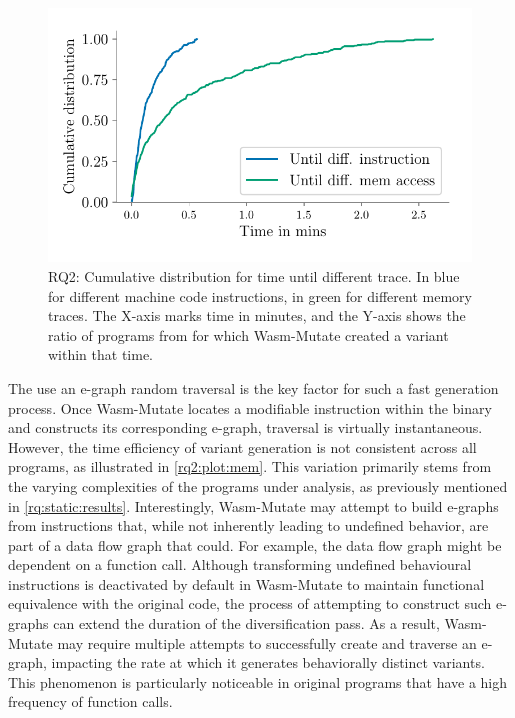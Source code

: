\documentclass[a4paper,fleqn]{cas-dc}
\newcommand*\badge[1]{ \colorbox{red}{\color{white}#1}}
\newcommand{\tool}{{\sc Wasm-Mutate}\xspace}
\newcommand{\todo}[1]{%
\refstepcounter{todo}
\noindent\textbf{\badge{TODO}} {\color{red}#1}
\addcontentsline{td}{todo}
{\color{red}\thesection.\thetodo\xspace #1}}
\begin{document}
\begin{figure}
    \centering
    \includegraphics[width=\linewidth]{plots/rq2/oracle.cumulative.pdf}
    \caption{RQ2: Cumulative distribution for time until different trace. In blue for different machine code instructions, in green for different memory traces. The X-axis marks time in minutes, and the Y-axis shows the ratio of programs from \nProgramsRosetta for which \tool created a variant within that time.}
  \label{rq2:plot:mem}
\end{figure}


The use an e-graph random traversal is the key factor for such a fast generation process.
Once \tool locates a modifiable instruction within the binary and constructs its corresponding e-graph, traversal is virtually instantaneous. 
However, the time efficiency of variant generation is not consistent across all programs, as illustrated in \autoref{rq2:plot:mem}. 
This variation primarily stems from the varying complexities of the programs under analysis, as previously mentioned in \autoref{rq:static:results}.
Interestingly, \tool may attempt to build e-graphs from instructions that, while not inherently leading to undefined behavior, are part of a data flow graph that could. 
For example, the data flow graph might be dependent on a function call. 
Although transforming undefined behavioural instructions is deactivated by default in \tool to maintain functional equivalence with the original code, the process of attempting to construct such e-graphs can extend the duration of the diversification pass.
As a result, \tool may require multiple attempts to successfully create and traverse an e-graph, impacting the rate at which it generates behaviorally distinct variants. 
This phenomenon is particularly noticeable in original programs that have a high frequency of function calls.
\end{document}
